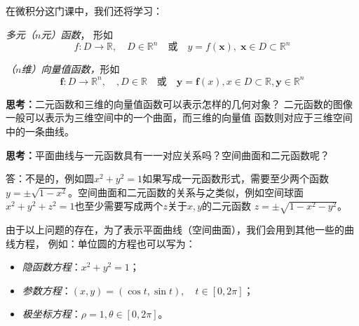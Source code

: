 \begin{shaded}
	在微积分这门课中，我们还将学习：

	{\it 多元（$n$元）函数}， 形如
	$$f:D\to\mathbb{R},\quad D\in\mathbb{R}^n\quad
	\mbox{或}\quad y=f(\bm{x}),\;\bm{x}\in D\subset\mathbb{R}^n$$

	{\it （$n$维）向量值函数，}形如
	$$\bm{f}:D\to\mathbb{R}^n,\quad, D\in\mathbb{R}\quad
	\mbox{或}\quad \bm{y}=\bm{f}(x),x\in D\subset\mathbb{R},
	\bm{y}\in\mathbb{R}^n$$
		
	{\bf 思考：}二元函数和三维的向量值函数可以表示怎样的几何对象？
	\ifhint
	二元函数的图像一般可以表示为三维空间中的一个曲面，而三维的向量值
	函数则对应于三维空间中的一条曲线。
	\fi
\end{shaded}
	
{\bf 思考：}平面曲线与一元函数具有一一对应关系吗？空间曲面和二元函数呢？

\ifhint
答：不是的，例如圆$x^2+y^2=1$如果写成一元函数形式，需要至少两个函数
$y=\pm\sqrt{1-x^2}$。空间曲面和二元函数的关系与之类似，例如空间球面
$x^2+y^2+z^2=1$也至少需要写成两个$z$关于$x,y$的二元函数
$z=\pm\sqrt{1-x^2-y^2}$。
	
由于以上问题的存在，为了表示平面曲线（空间曲面），我们会用到其他一些的曲线方程，
例如：单位圆的方程也可以写为：
\begin{itemize}
	\item {\it 隐函数方程}：$x^2+y^2=1$；
	\item {\it 参数方程}：$(x,y)=(\cos t,\sin t),\quad t\in[0,2\pi]$；
	\item {\it 极坐标方程}：$\rho=1,\theta\in[0,2\pi]$。
\end{itemize}
\fi
	
